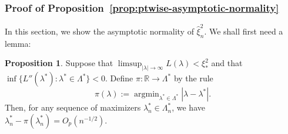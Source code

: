 \documentclass{article}
\theoremstyle{definition}
\newtheorem{proposition}{Proposition}
\DeclareMathOperator*{\argmin}{argmin}
\newcommand{\R}{\mathbb{R}}
\newcommand{\1}{\mathbbm{1}}
\begin{document}
\subsubsection{Proof of Proposition~\ref{prop:ptwise-asymptotic-normality}}
In this section, we show the asymptotic normality of $\hat \xi_n^2$. We shall first need a lemma: 
\begin{proposition}
\label{prop:maximizer-root-n}
    Suppose that $\limsup_{|\lambda| \to \infty} L(\lambda) < \xi_*^2$ and that $\inf \{L''(\lambda^*): \lambda^* \in \Lambda^*\} < 0$. Define $\pi: \R \to \Lambda^*$ by the rule 
    \[
    \pi(\lambda) := \argmin_{\lambda^* \in \Lambda^*} |\lambda - \lambda^*|.
    \]
    Then, for any sequence of maximizers $\lambda^*_n \in \Lambda^*_n$, we have $\lambda^*_n - \pi(\lambda^*_n) = O_p(n^{-1/2})$. 
\end{proposition}
\end{document}
